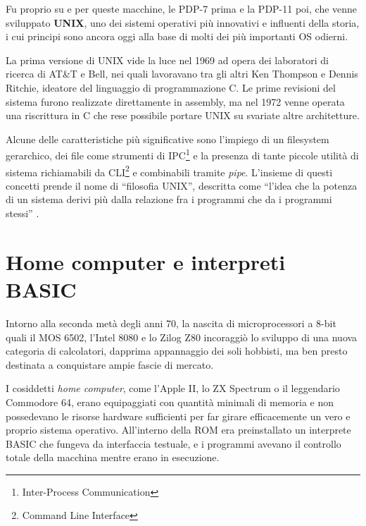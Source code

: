 \documentclass[12pt,a4paper]{report}
\newcommand{\vir}[1]{``#1''}
\begin{document}
		Fu proprio su e per queste macchine, le PDP-7 prima e la PDP-11 poi, che venne sviluppato \textbf{UNIX}, uno
		dei sistemi operativi più innovativi e influenti della storia, i cui principi sono ancora oggi alla base di
		molti dei più importanti OS odierni.
		
		La prima versione di UNIX vide la luce nel 1969 ad opera dei laboratori di ricerca di AT\&T e Bell, nei quali
		lavoravano tra gli altri Ken Thompson e Dennis Ritchie, ideatore del linguaggio di programmazione C.
		Le prime revisioni del sistema furono realizzate direttamente in assembly, ma nel 1972 venne operata
		una riscrittura in C che rese possibile portare UNIX su svariate altre architetture.

		Alcune delle caratteristiche più significative sono l'impiego di un filesystem gerarchico, dei file come strumenti di
		IPC\footnote{Inter-Process Communication} e la presenza di tante piccole utilità di sistema richiamabili da CLI\footnote{Command Line Interface}
		e combinabili tramite \emph{pipe}.
		L'insieme di questi concetti prende il nome di \vir{filosofia UNIX}, descritta come \vir{l'idea che la potenza di un sistema
		derivi più dalla relazione fra i programmi che da i programmi stessi} \cite{Kernighan}.
		
	\section{Home computer e interpreti BASIC}
		Intorno alla seconda metà degli anni 70, la nascita di microprocessori a 8-bit quali il MOS 6502, l'Intel 8080 e lo Zilog Z80
		incoraggiò lo sviluppo di una nuova categoria di calcolatori, dapprima appannaggio dei soli hobbisti, ma ben presto
		destinata a conquistare ampie fascie di mercato.
		
		I cosiddetti \emph{home computer}, come l'Apple II, lo ZX Spectrum o il leggendario Commodore 64, erano equipaggiati
		con quantità minimali di memoria e non possedevano le risorse hardware sufficienti per far girare efficacemente un vero
		e proprio sistema operativo. All'interno della ROM era preinstallato un interprete BASIC che fungeva da interfaccia testuale,
		e i programmi avevano il controllo totale della macchina mentre erano in esecuzione.
		
\end{document}
